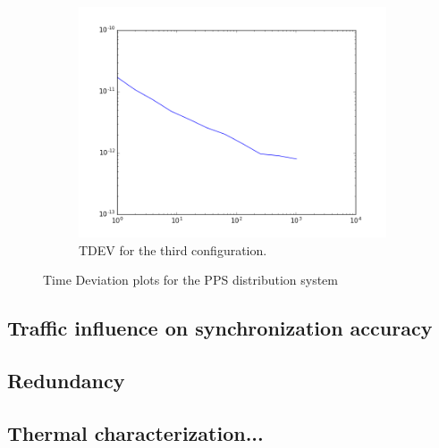 \begin{figure}
    \centering
    \begin{subfigure}[t]{.45\textwidth}
        \centering
        \includegraphics[width=\textwidth]{img/pps_p3.png}
        \caption{TDEV for the third configuration.}
        \label{fig:pps_p3}
    \end{subfigure}
    \caption{Time Deviation plots for the PPS distribution system}
    \label{fig:tdev_plots}
\end{figure}


\subsection{Traffic influence on synchronization accuracy}


\subsection{Redundancy}


\subsection{Thermal characterization...}


 
